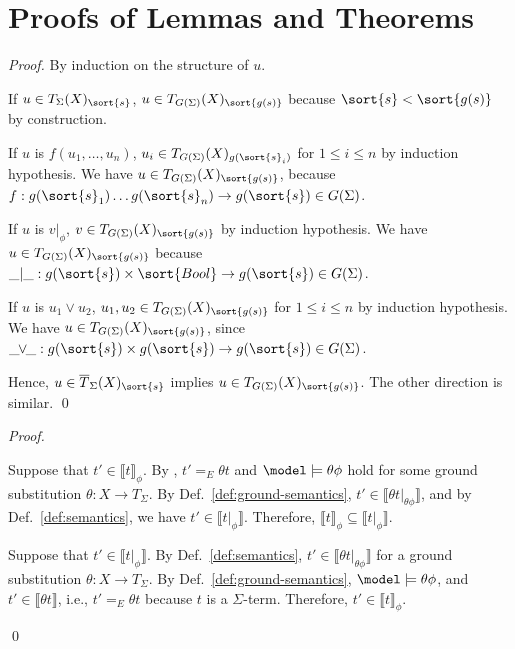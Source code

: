 

\section{Proofs of Lemmas and Theorems}
\label{sec.proofs}

\exsig*
\begin{proof}
By induction on the structure of $u$.
%
\begin{inparaenum}[(1)]
	\item If $u \in {T}_{\Sigma}(X)_{\sort{s}}$,  $u \in {T}_{G(\Sigma)}(X)_{\sort{g(s)}}$ because $\sort{s} < \sort{g(s)}$ by construction.
%
	\item If $u$ is $f(u_1,\ldots,u_n)$,
	 $u_i \in {T}_{G(\Sigma)}(X)_{g(\sort{s}_i)}$ for $1 \leq i \leq n$
	 by induction hypothesis.
	We have 
	$u \in {T}_{G(\Sigma)}(X)_{\sort{g(s)}}$, because $f : g(\sort{s}_1) \ldots g(\sort{s}_n) \to g(\sort{s}) \in G(\Sigma)$.
%
	\item If $u$ is $v |_{\phi}$, $v \in {T}_{G(\Sigma)}(X)_{\sort{g(s)}}$ by induction hypothesis.
	We have $u \in {T}_{G(\Sigma)}(X)_{\sort{g(s)}}$
	because $\_|\_ : g(\sort{s}) \times \sort{Bool} \to g(\sort{s}) \in G(\Sigma)$.	
%
	\item If $u$ is $u_1 \vee u_2$, $u_1, u_2 \in {T}_{G(\Sigma)}(X)_{\sort{g(s)}}$ for $1 \leq i \leq n$  
	by induction hypothesis.
	We have
	$u \in {T}_{G(\Sigma)}(X)_{\sort{g(s)}}$,
	since $\_\!\!\vee\!\!\_ : g(\sort{s}) \times g(\sort{s}) \to g(\sort{s}) \in G(\Sigma)$.
%
\end{inparaenum}
Hence, $u \in \overline{T}_{\Sigma}(X)_{\sort{s}}$ implies $u \in {T}_{G(\Sigma)}(X)_{\sort{g(s)}}$.
%
The other direction is similar. 
\qed
\end{proof}


\specialcase*
\begin{proof}
\begin{inparaenum}[(1)]
	\item Suppose that $t' \in \llbracket t \rrbracket_\phi$.
By \cite[Definition 6]{rocha-rewsmtjlamp-2017}, 
$t' =_{E} \theta t$ and $\model \models \theta\phi$ hold
for some ground substitution  $\theta: X \to T_{\Sigma}$.
By Def.~\ref{def:ground-semantics}, $t' \in \llbracket \theta t |_{\theta\phi} \rrbracket$,
and by Def.~\ref{def:semantics},
we have $t' \in \llbracket t |_\phi \rrbracket$.
Therefore, $\llbracket t \rrbracket_\phi \subseteq \llbracket t |_\phi \rrbracket$.
%
	\item Suppose that $t' \in \llbracket t |_\phi \rrbracket$.
	By Def.~\ref{def:semantics}, $t' \in \llbracket \theta t |_{\theta \phi} \rrbracket$ for a ground substitution $\theta: X \to T_{\Sigma}$.
	By Def.~\ref{def:ground-semantics}, $\model \models \theta\phi$,
	and $t' \in \llbracket \theta t  \rrbracket$, i.e., $t' =_E \theta t$ because $t$ is a $\Sigma$-term. 
	Therefore, $t' \in \llbracket t \rrbracket_\phi$.
\end{inparaenum}
\qed
\end{proof}

